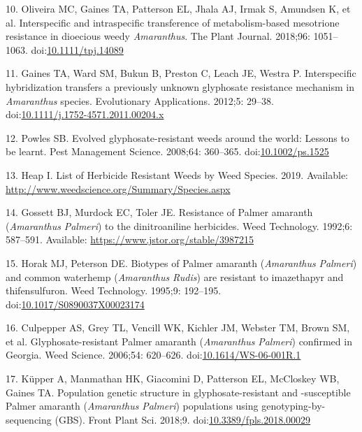 \documentclass[10pt,letterpaper]{article}
\begin{document}
\leavevmode\hypertarget{ref-oliveira_interspecific_2018}{}%
10. Oliveira MC, Gaines TA, Patterson EL, Jhala AJ, Irmak S, Amundsen K,
et al. Interspecific and intraspecific transference of metabolism-based
mesotrione resistance in dioecious weedy \emph{Amaranthus}. The Plant
Journal. 2018;96: 1051--1063.
doi:\href{https://doi.org/10.1111/tpj.14089}{10.1111/tpj.14089}

\leavevmode\hypertarget{ref-gaines_interspecific_2012}{}%
11. Gaines TA, Ward SM, Bukun B, Preston C, Leach JE, Westra P.
Interspecific hybridization transfers a previously unknown glyphosate
resistance mechanism in \emph{Amaranthus} species. Evolutionary
Applications. 2012;5: 29--38.
doi:\href{https://doi.org/10.1111/j.1752-4571.2011.00204.x}{10.1111/j.1752-4571.2011.00204.x}

\leavevmode\hypertarget{ref-powles_evolved_2008}{}%
12. Powles SB. Evolved glyphosate-resistant weeds around the world:
Lessons to be learnt. Pest Management Science. 2008;64: 360--365.
doi:\href{https://doi.org/10.1002/ps.1525}{10.1002/ps.1525}

\leavevmode\hypertarget{ref-heap_list_2019-1}{}%
13. Heap I. List of Herbicide Resistant Weeds by Weed Species. 2019.
Available: \url{http://www.weedscience.org/Summary/Species.aspx}

\leavevmode\hypertarget{ref-gossett_resistance_1992}{}%
14. Gossett BJ, Murdock EC, Toler JE. Resistance of Palmer amaranth
(\emph{Amaranthus} \emph{Palmeri}) to the dinitroaniline herbicides.
Weed Technology. 1992;6: 587--591. Available:
\url{https://www.jstor.org/stable/3987215}

\leavevmode\hypertarget{ref-horak_biotypes_1995}{}%
15. Horak MJ, Peterson DE. Biotypes of Palmer amaranth
(\emph{Amaranthus} \emph{Palmeri}) and common waterhemp
(\emph{Amaranthus} \emph{Rudis}) are resistant to imazethapyr and
thifensulfuron. Weed Technology. 1995;9: 192--195.
doi:\href{https://doi.org/10.1017/S0890037X00023174}{10.1017/S0890037X00023174}

\leavevmode\hypertarget{ref-culpepper_glyphosate-resistant_2006}{}%
16. Culpepper AS, Grey TL, Vencill WK, Kichler JM, Webster TM, Brown SM,
et al. Glyphosate-resistant Palmer amaranth (\emph{Amaranthus}
\emph{Palmeri}) confirmed in Georgia. Weed Science. 2006;54: 620--626.
doi:\href{https://doi.org/10.1614/WS-06-001R.1}{10.1614/WS-06-001R.1}

\leavevmode\hypertarget{ref-kupper_population_2018}{}%
17. Küpper A, Manmathan HK, Giacomini D, Patterson EL, McCloskey WB,
Gaines TA. Population genetic structure in glyphosate-resistant and
-susceptible Palmer amaranth (\emph{Amaranthus} \emph{Palmeri})
populations using genotyping-by-sequencing (GBS). Front Plant Sci.
2018;9.
doi:\href{https://doi.org/10.3389/fpls.2018.00029}{10.3389/fpls.2018.00029}
\end{document}
